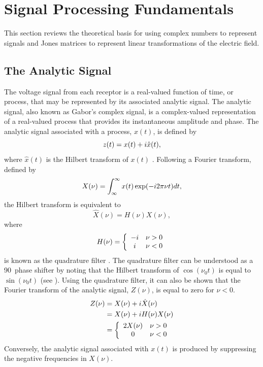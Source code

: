 \section{Signal Processing Fundamentals}
\label{app:foundations}

This section reviews the theoretical basis for using complex numbers to represent signals and Jones matrices to represent linear transformations of the electric field.

\subsection{The Analytic Signal}
\label{app:analytic}

The voltage signal from each receptor is a real-valued function of
time, or process, that may be represented by its associated analytic
signal.
%
The analytic signal, also known as Gabor's complex signal, is a
complex-valued representation of a real-valued process that provides
its instantaneous amplitude and phase.  
%
The analytic signal associated with a process, $x(t)$, is defined by
\begin{equation}
  z(t) = x(t) + i\hat x(t),
\end{equation}
%
where $\hat x(t)$ is the Hilbert transform of $x(t)$ \citep{pap65}.
%
Following a Fourier transform, defined by
\begin{equation}
  X(\nu) = \int_\infty^\infty x(t) \exp(- i 2\pi \nu t) dt,
  \label{eqn:Fourier_transform}
\end{equation}
%
the Hilbert transform is equivalent to
\begin{equation}
\hat{X}(\nu)=H(\nu)X(\nu),    
\end{equation}
where
%
\begin{equation} H(\nu) = \left\{ \begin{array}{cc}
                -i  & \nu > 0 \\
                i & \nu < 0
                \end{array} \right.
\end{equation}
is known as the quadrature filter \citep{pap65}.  
%
The quadrature filter can be understood as a
90\degr\ phase shifter by noting that 
the Hilbert transform of $\cos(\nu_0t)$ is equal to
$\sin(\nu_0t)$ (see ).  
%
Using the quadrature filter, it can also be
shown that the Fourier transform of the analytic signal, $Z(\nu)$, is
equal to zero for $\nu < 0$.
\begin{equation}
\begin{split}
 Z(\nu) & =  X(\nu) + i\hat X(\nu) \\
	& =  X(\nu) + i H(\nu)X(\nu) \\
	& =  \left \{ \begin{array}{cc} 
	2X(\nu)  & \nu > 0 \\
	0 & \nu < 0 
	\end{array} \right.
\end{split}
\end{equation}
Conversely, the analytic signal associated with $x(t)$ is
produced
by suppressing the negative frequencies in $X(\nu)$.

